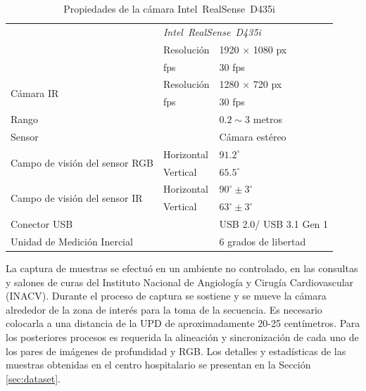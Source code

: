 \setlength{\tabcolsep}{0.5em} %
{\renewcommand{\arraystretch}{1.2}%
\begin{table}[ht]
	\centering
	\begin{tabular}{lll} 
		\hhline{===}
		& \multicolumn{2}{l}{\textit{Intel\textregistered~RealSense\texttrademark~D435i}}  \\ 
		\hhline{===}
		\multirow{2}{*}{Cámara RGB}                     & Resolución & 1920 $\times$ 1080 px                                       \\ 
		\cline{2-3}
		& fps        & 30 fps                                       \\ 
		\hline
		\multirow{2}{*}{Cámara IR}                      & Resolución &     1280 $\times$ 720 px                                   \\ 
		\cline{2-3}
		& fps        & 30 fps                                    \\ 
		\hline
		Rango                                           &            & $0.2\sim3$ metros                                \\ 
		\hline
		Sensor                                          &            & Cámara estéreo                                \\ 
		\hline
		\multirow{2}{*}{Campo de visión del sensor RGB} & Horizontal          & $91.2^\circ$                                       \\ 
		\cline{2-3}
		& Vertical         & $65.5^\circ$                                       \\ 
		\hline
		\multirow{2}{*}{Campo de visión del sensor IR}                    & Horizontal         & $90^\circ  \pm 3^\circ$                                     \\
		\cline{2-3}
		& Vertical         & $63^\circ  \pm 3^\circ$                                 \\ 
		\hline
		Conector USB                                             &            & USB 2.0/ USB 3.1 Gen 1                                    \\
		\hline
		Unidad de Medición Inercial & & 6 grados de libertad
		\\
		\hline
	\end{tabular}

	\caption{Propiedades de la cámara Intel\textregistered~RealSense\texttrademark~D435i} 
	\label{tab:d435i}
\end{table}

La captura de muestras se efectuó en un ambiente no controlado, en las consultas y salones de curas del Instituto Nacional de Angiología y Cirugía Cardiovascular (INACV). Durante el proceso de captura se sostiene y se mueve la cámara alrededor de la zona de interés para la toma de la secuencia. Es necesario colocarla a una distancia de la UPD de aproximadamente 20-25 centímetros. Para los posteriores procesos es requerida la alineación y sincronización de cada uno de los pares de imágenes de profundidad y RGB.  Los detalles y estadísticas de las muestras obtenidas en el centro hospitalario se presentan en la Sección \ref{sec:dataset}.

}
